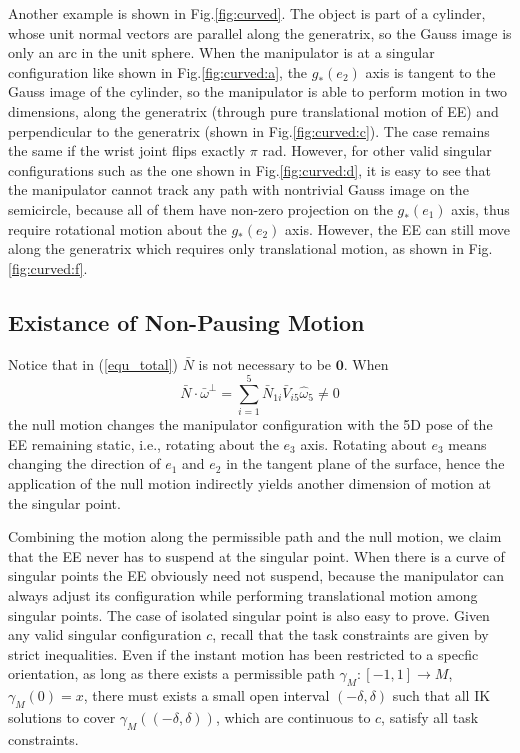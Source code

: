 \documentclass[Afour,sageh,times]{sagej}
\begin{document}
Another example is shown in Fig.\ref{fig:curved}. 
The object is part of a cylinder, whose unit normal vectors are parallel along the generatrix, so the Gauss image is only an arc in the unit sphere. 
When the manipulator is at a singular configuration like shown in Fig.\ref{fig:curved:a}, the $g_*(e_2)$ axis is tangent to the Gauss image of the cylinder, so the manipulator is able to perform motion in two dimensions, along the generatrix (through pure translational motion of EE) and perpendicular to the generatrix (shown in Fig.\ref{fig:curved:c}). The case remains the same if the wrist joint flips exactly $\pi$ rad. 
However, for other valid singular configurations such as the one shown in Fig.\ref{fig:curved:d}, it is easy to see that the manipulator cannot track any path with nontrivial Gauss image on the semicircle, because all of them have non-zero projection on the $g_*(e_1)$ axis, thus require rotational motion about the $g_*(e_2)$ axis. However, the EE can still move along the generatrix which requires only translational motion, as shown in Fig.\ref{fig:curved:f}. 


\subsection{Existance of Non-Pausing Motion}
Notice that in (\ref{equ_total}) $\bar{N}$ is not necessary to be $\bm{0}$. 
When
\begin{equation}\label{equ_notzero}
\bar{N}\cdot \bar{\omega}^\perp = \sum\limits_{i = 1}^5 \bar{N}_{1i}\bar{V}_{i5}\hat{\omega}_5 \neq 0
\end{equation}
the null motion changes the manipulator configuration with the 5D pose of the EE remaining static, i.e., rotating about the $e_3$ axis. 
Rotating about $e_3$ means changing the direction of $e_1$ and $e_2$ in the tangent plane of the surface, hence the application of the null motion indirectly yields another dimension of motion at the singular point.  

Combining the motion along the permissible path and the null motion, we claim that the EE never has to suspend at the singular point. 
When there is a curve of singular points the EE obviously need not suspend, because the manipulator can always adjust its configuration while performing translational motion among singular points. 
The case of isolated singular point is also easy to prove. 
Given any valid singular configuration $c$, recall that the task constraints are given by strict inequalities. 
Even if the instant motion has been restricted to a specfic orientation, as long as there exists a permissible path $\gamma_M: [-1, 1]\rightarrow M$, $\gamma_M(0) = x$, there must exists a small open interval $(-\delta, \delta)$ such that all IK solutions to cover $\gamma_M((-\delta, \delta))$, which are continuous to $c$, satisfy all task constraints. 
\end{document}
